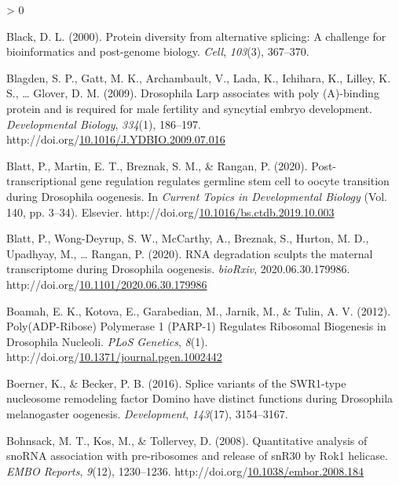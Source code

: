 \documentclass[12pt,oneside]{reedthesis}
\newlength{\cslhangindent}
\newenvironment{CSLReferences}[2] %
 {%
  \setlength{\parindent}{0pt}
  \ifodd #1 \everypar{\setlength{\hangindent}{\cslhangindent}}\ignorespaces\fi
  \ifnum #2 > 0
  \setlength{\parskip}{#2\baselineskip}
  \fi
 }%
 {}
\begin{document}
\begin{CSLReferences}{1}{0}
\leavevmode\hypertarget{ref-Black2000}{}%
Black, D. L. (2000). Protein diversity from alternative splicing: A challenge for bioinformatics and post-genome biology. \emph{Cell}, \emph{103}(3), 367--370.

\leavevmode\hypertarget{ref-Blagden2009f}{}%
Blagden, S. P., Gatt, M. K., Archambault, V., Lada, K., Ichihara, K., Lilley, K. S., \ldots{} Glover, D. M. (2009). Drosophila {Larp} associates with poly ({A})-binding protein and is required for male fertility and syncytial embryo development. \emph{Developmental Biology}, \emph{334}(1), 186--197. http://doi.org/\href{https://doi.org/10.1016/J.YDBIO.2009.07.016}{10.1016/J.YDBIO.2009.07.016}

\leavevmode\hypertarget{ref-blattPosttranscriptionalGeneRegulation2020}{}%
Blatt, P., Martin, E. T., Breznak, S. M., \& Rangan, P. (2020). Post-transcriptional gene regulation regulates germline stem cell to oocyte transition during {Drosophila} oogenesis. In \emph{Current {Topics} in {Developmental Biology}} (Vol. 140, pp. 3--34). {Elsevier}. http://doi.org/\href{https://doi.org/10.1016/bs.ctdb.2019.10.003}{10.1016/bs.ctdb.2019.10.003}

\leavevmode\hypertarget{ref-blattRNADegradationSculpts2020}{}%
Blatt, P., Wong-Deyrup, S. W., McCarthy, A., Breznak, S., Hurton, M. D., Upadhyay, M., \ldots{} Rangan, P. (2020). {RNA} degradation sculpts the maternal transcriptome during {Drosophila} oogenesis. \emph{bioRxiv}, 2020.06.30.179986. http://doi.org/\href{https://doi.org/10.1101/2020.06.30.179986}{10.1101/2020.06.30.179986}

\leavevmode\hypertarget{ref-boamahPolyADPRibosePolymerase2012}{}%
Boamah, E. K., Kotova, E., Garabedian, M., Jarnik, M., \& Tulin, A. V. (2012). Poly({ADP-Ribose}) {Polymerase} 1 ({PARP-1}) {Regulates Ribosomal Biogenesis} in {Drosophila Nucleoli}. \emph{PLoS Genetics}, \emph{8}(1). http://doi.org/\href{https://doi.org/10.1371/journal.pgen.1002442}{10.1371/journal.pgen.1002442}

\leavevmode\hypertarget{ref-Boerner2016}{}%
Boerner, K., \& Becker, P. B. (2016). Splice variants of the {SWR1-type} nucleosome remodeling factor {Domino} have distinct functions during {Drosophila} melanogaster oogenesis. \emph{Development}, \emph{143}(17), 3154--3167.

\leavevmode\hypertarget{ref-bohnsackQuantitativeAnalysisSnoRNA2008}{}%
Bohnsack, M. T., Kos, M., \& Tollervey, D. (2008). Quantitative analysis of {snoRNA} association with pre-ribosomes and release of {snR30} by {Rok1} helicase. \emph{EMBO Reports}, \emph{9}(12), 1230--1236. http://doi.org/\href{https://doi.org/10.1038/embor.2008.184}{10.1038/embor.2008.184}


\end{CSLReferences}
\end{document}
